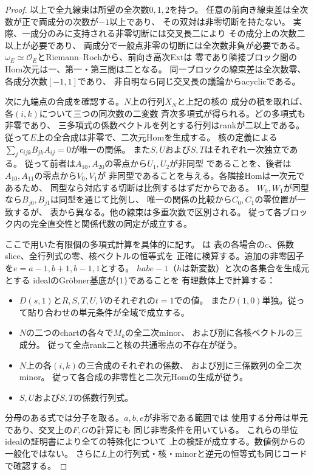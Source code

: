 \begin{proof}
以上で全九線束は所望の全次数$0,1,2$を持つ。
任意の前向き線束差は全次数が正で両成分の次数が$-1$以上であり、
その双対は非零切断を持たない。
実際、一成分のみに支持される非零切断には交叉長二により
その成分上の次数二以上が必要であり、
両成分で一般点非零の切断には全次数非負が必要である。
$\omega_E\simeq\mathcal O_E$とRiemann--Rochから、前向き高次Extは
零であり隣接ブロック間のHom次元は一、第一・第三間は二となる。
同一ブロックの線束差は全次数零、各成分次数$[-1,1]$であり、
非自明なら同じ交叉長の議論からacyclicである。

次に九端点の合成を確認する。$N$上の行列$X_N$と上記の核の
成分の積を取れば、各$(i,k)$について三つの同次数の二変数
斉次多項式が得られる。どの多項式も非零であり、
三多項式の係数ベクトルを列とする行列はrankが二以上である。
従って$E$上の全合成は非零で、二次元Homを生成する。
核の定義による$\sum_j c_{ijk}B_{jk}A_{ij}=0$が唯一の関係。
また$S,U$および$S,T$はそれぞれ一次独立である。
従って前者は$A_{10},A_{20}$の零点から$U_1,U_2$が非同型
であることを、後者は$A_{10},A_{11}$の零点から$V_0,V_1$が
非同型であることを与える。各隣接Homは一次元であるため、
同型なら対応する切断は比例するはずだからである。
$W_0,W_1$が同型なら$B_{j0},B_{j1}$は同型を通じて比例し、
唯一の関係の比較から$C_0,C_1$の零位置が一致するが、
表から異なる。他の線束は多重次数で区別される。
従って各ブロック内の完全直交性と関係代数の同定が成立する。

ここで用いた有限個の多項式計算を具体的に記す。
は
表の各場合の$c$、係数slice、全行列式の零、核ベクトルの恒等式を
正確に検算する。追加の非零因子を$e=a-1,b+1,b-1,1$とする。
$hab e-1$（$h$は新変数）と次の各集合を生成元とする
idealのGröbner基底が$\{1\}$であることを
有理数体上で計算する：
\begin{itemize}
\item $D(s,1)$と$R,S,T,U,V$のそれぞれの$t=1$での値。
また$D(1,0)$単独。従って貼り合わせの単元条件が全域で成立する。
\item $N$の二つのchartの各々で$M_k$の全二次minor、
および別に各核ベクトルの三成分。
従って全点rank二と核の共通零点の不存在が従う。
\item $N$上の各$(i,k)$の三合成のそれぞれの係数、
および別に三係数列の全二次minor。
従って各合成の非零性と二次元Homの生成が従う。
\item $S,U$および$S,T$の係数行列式。
\end{itemize}
分母のある式では分子を取る。$a,b,e$が非零である範囲では
使用する分母は単元であり、交叉上の$F,G$の計算にも
同じ非零条件を用いている。
これらの単位idealの証明書により全ての特殊化について
上の検証が成立する。数値例からの一般化ではない。
さらに$L$上の行列式・核・minorと逆元の恒等式も同じコードで確認する。


\end{proof}
